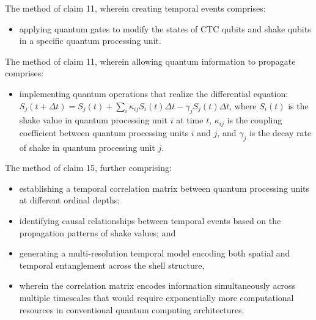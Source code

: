 \documentclass[12pt,letterpaper]{article}
\begin{document}
\begin{patentclaims}
    \item The method of claim 11, wherein creating temporal events comprises:
    \begin{itemize}[leftmargin=2em]
        \item applying quantum gates to modify the states of CTC qubits and shake qubits in a specific quantum processing unit.
    \end{itemize}
    
    \item The method of claim 11, wherein allowing quantum information to propagate comprises:
    \begin{itemize}[leftmargin=2em]
        \item implementing quantum operations that realize the differential equation:
        $S_j(t+\Delta t) = S_j(t) + \sum_i \kappa_{ij} S_i(t) \Delta t - \gamma_j S_j(t) \Delta t$,
        where $S_i(t)$ is the shake value in quantum processing unit $i$ at time $t$, $\kappa_{ij}$ is the coupling coefficient between quantum processing units $i$ and $j$, and $\gamma_j$ is the decay rate of shake in quantum processing unit $j$.
    \end{itemize}
    
    \item The method of claim 15, further comprising:
    \begin{itemize}[leftmargin=2em]
        \item establishing a temporal correlation matrix between quantum processing units at different ordinal depths;
        \item identifying causal relationships between temporal events based on the propagation patterns of shake values; and 
        \item generating a multi-resolution temporal model encoding both spatial and temporal entanglement across the shell structure,
        \item wherein the correlation matrix encodes information simultaneously across multiple timescales that would require exponentially more computational resources in conventional quantum computing architectures.
    \end{itemize}
    

\end{patentclaims}
\end{document}
